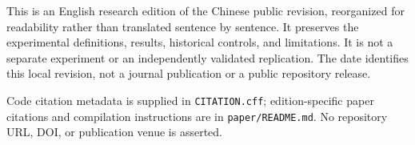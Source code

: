 \documentclass[11pt,a4paper]{article}
\begin{document}
This is an English research edition of the Chinese public revision, reorganized for readability rather than translated sentence by sentence. It preserves the experimental definitions, results, historical controls, and limitations. It is not a separate experiment or an independently validated replication. The date identifies this local revision, not a journal publication or a public repository release.

Code citation metadata is supplied in \texttt{CITATION.cff}; edition-specific paper citations and compilation instructions are in \texttt{paper/README.md}. No repository URL, DOI, or publication venue is asserted.
\clearpage

\tableofcontents\clearpage
{}





\clearpage
\clearpage{}
\nocite{*}
\clearpage
\end{document}
